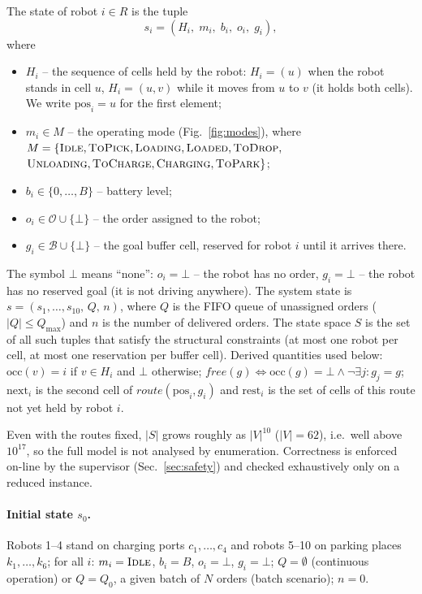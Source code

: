 \documentclass[11pt,a4paper]{article}
\newcommand{\md}[1]{\textsc{#1}}            %
\newcommand{\occ}{\mathrm{occ}}
\newcommand{\pos}{\mathrm{pos}}
\newcommand{\nxt}{\mathrm{next}}
\newcommand{\rest}{\mathrm{rest}}
\newcommand{\Bf}{\mathcal{B}}
\newcommand{\nil}{\bot}
\begin{document}
The state of robot $i\in R$ is the tuple
\[
  s_i = (H_i,\; m_i,\; b_i,\; o_i,\; g_i),
\]
where
\begin{itemize}[leftmargin=*]
  \item $H_i$ -- the sequence of cells held by the robot: $H_i=(u)$ when the
        robot stands in cell $u$, $H_i=(u,v)$ while it moves from $u$ to $v$
        (it holds both cells). We write $\pos_i=u$ for the first element;
  \item $m_i \in M$ -- the operating mode (Fig.~\ref{fig:modes}), where
        $M = \{\md{Idle}, \md{ToPick}, \md{Loading}, \md{Loaded}, \md{ToDrop},$
        $\md{Unloading}, \md{ToCharge}, \md{Charging}, \md{ToPark}\}$;
  \item $b_i\in\{0,\dots,B\}$ -- battery level;
  \item $o_i \in \mathcal{O}\cup\{\nil\}$ -- the order assigned to the robot;
  \item $g_i \in \Bf\cup\{\nil\}$ -- the goal buffer cell, reserved for robot $i$
        until it arrives there.
\end{itemize}
The symbol $\nil$ means ``none'': $o_i=\nil$ -- the robot has no order,
$g_i=\nil$ -- the robot has no reserved goal (it is not driving anywhere).
The system state is $s = (s_1,\dots,s_{10},\,Q,\,n)$, where $Q$ is the FIFO
queue of unassigned orders ($|Q|\le Q_{\max}$) and $n$ is the number of
delivered orders. The state space $S$ is the set of all such tuples that
satisfy the structural constraints (at most one robot per cell, at most one
reservation per buffer cell). Derived quantities used below:
$\occ(v)=i$ if $v\in H_i$ and $\nil$ otherwise; $\mathit{free}(g)\iff
\occ(g)=\nil \wedge \neg\exists j\colon g_j=g$; $\nxt_i$ is the second cell of
$\mathit{route}(\pos_i,g_i)$ and $\rest_i$ is the set of cells of this route
not yet held by robot $i$.

Even with the routes fixed, $|S|$ grows roughly as $|V|^{10}$
($|V|=62$), i.e.\ well above $10^{17}$, so the full model is not analysed by
enumeration. Correctness is enforced on-line by the supervisor
(Sec.~\ref{sec:safety}) and checked exhaustively only on a reduced instance.

\paragraph{Initial state $s_0$.} Robots 1--4 stand on charging ports
$c_1,\dots,c_4$ and robots 5--10 on parking places $k_1,\dots,k_6$; for all
$i$: $m_i=\md{Idle}$, $b_i=B$, $o_i=\nil$, $g_i=\nil$; $Q=\emptyset$
(continuous operation) or $Q=Q_0$, a given batch of $N$ orders (batch
scenario); $n=0$.
\end{document}
